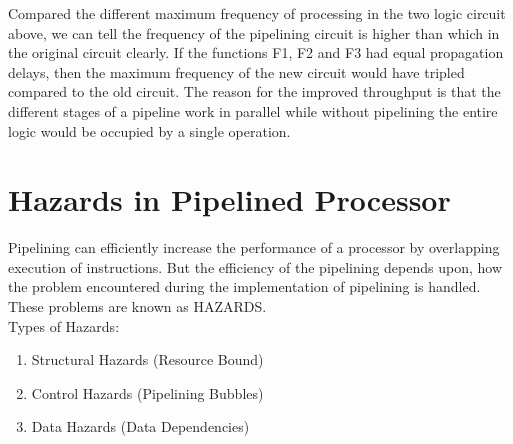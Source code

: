 \documentclass[12pt,a4paper]{report}
\begin{document}
\noindent Compared the different maximum frequency of processing in the two logic circuit above, we can tell the frequency of the pipelining circuit is higher than which in the original circuit clearly. If the functions F1, F2 and F3 had equal propagation delays, then the maximum frequency of the new circuit would have tripled compared to the old circuit. The reason for the improved throughput is that the different stages of a pipeline work in parallel while without pipelining the entire logic would be occupied by a single operation.\\
\section{Hazards in Pipelined Processor}
Pipelining can efficiently increase the performance of a processor by overlapping execution of instructions. But the efficiency of the pipelining depends upon, how the problem encountered during the implementation of pipelining is handled. These problems are known as HAZARDS.\\
Types of Hazards:
\begin{enumerate}
  \item Structural Hazards (Resource Bound)
  \item Control Hazards (Pipelining Bubbles)
  \item Data Hazards (Data Dependencies)
\end{enumerate}
\end{document}
